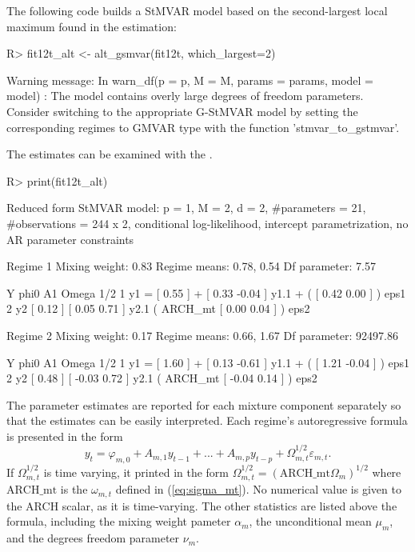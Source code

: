 \documentclass[nojss]{jss}
\begin{document}
The following code builds a StMVAR model based on the second-largest local maximum found in the estimation:
%
\begin{CodeChunk}
\begin{CodeInput}
R> fit12t_alt <- alt_gsmvar(fit12t, which_largest=2)
\end{CodeInput}
\begin{CodeOutput}
Warning message:
In warn_df(p = p, M = M, params = params, model = model) :
  The model contains overly large degrees of freedom parameters. Consider
  switching to the appropriate G-StMVAR model by setting the corresponding
  regimes to GMVAR type with the function 'stmvar_to_gstmvar'.
\end{CodeOutput}
\end{CodeChunk}
%

The estimates can be examined with the .
%
\begin{CodeChunk}
\begin{CodeInput}
R> print(fit12t_alt)
\end{CodeInput}
\begin{CodeOutput}
Reduced form StMVAR model:
 p = 1, M = 2, d = 2, #parameters = 21, #observations = 244 x 2,
 conditional log-likelihood, intercept parametrization, no AR parameter
 constraints

Regime 1
Mixing weight: 0.83
Regime means: 0.78, 0.54
Df parameter:  7.57

   Y     phi0          A1                            Omega          1/2
1 y1 = [ 0.55 ] + [  0.33 -0.04 ] y1.1 + (         [  0.42 0.00 ] )     eps1
2 y2   [ 0.12 ]   [  0.05  0.71 ] y2.1   ( ARCH_mt [  0.00 0.04 ] )     eps2

Regime 2
Mixing weight: 0.17
Regime means: 0.66, 1.67
Df parameter:  92497.86

   Y     phi0          A1                            Omega           1/2
1 y1 = [ 1.60 ] + [  0.13 -0.61 ] y1.1 + (         [  1.21 -0.04 ] )     eps1
2 y2   [ 0.48 ]   [ -0.03  0.72 ] y2.1   ( ARCH_mt [ -0.04  0.14 ] )     eps2
\end{CodeOutput}
\end{CodeChunk}
%
The parameter estimates are reported for each mixture component separately so that the estimates can be easily interpreted. Each regime's autoregressive formula is presented in the form
\begin{equation}
y_t = \varphi_{m,0} + A_{m,1}y_{t - 1} + ... + A_{m,p}y_{t - p} + \Omega_{m,t}^{1/2}\varepsilon_{m,t}.
\end{equation}
If $\Omega_{m,t}^{1/2}$ is time varying, it printed in the form $\Omega_{m,t}^{1/2}=(\text{ARCH\_mt}\Omega_m)^{1/2}$ where $\text{ARCH\_mt}$ is the $\omega_{m,t}$ defined in (\ref{eq:sigma_mt}). No numerical value is given to the ARCH scalar, as it is time-varying. The other statistics are listed above the formula, including the mixing weight pameter $\alpha_m$, the unconditional mean $\mu_m$, and the degrees freedom parameter $\nu_m$.
\end{document}
